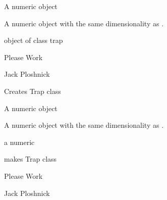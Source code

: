 \documentclass[a4paper]{book}
\begin{document}
%
\begin{Arguments}
\begin{ldescription}
\item[\code{x}] A numeric object

\item[\code{y}] A numeric object with the same dimensionality as .

\item[\code{StartToEnd}] 
\end{ldescription}
\end{Arguments}
%
\begin{Value}
object of class trap
\end{Value}
%
\begin{Note}\relax
Please Work
\end{Note}
%
\begin{Author}\relax
Jack Ploshnick
\end{Author}
%
\begin{SeeAlso}\relax
{}
\end{SeeAlso}
%
\begin{Description}\relax
Creates Trap class
\end{Description}
%
\begin{Arguments}
\begin{ldescription}
\item[\code{x}] A numeric object

\item[\code{y}] A numeric object with the same dimensionality as .

\item[\code{estimate}] a numeric
\end{ldescription}
\end{Arguments}
%
\begin{Value}
makes Trap class
\end{Value}
%
\begin{Note}\relax
Please Work
\end{Note}
%
\begin{Author}\relax
Jack Ploshnick
\end{Author}
%
\begin{SeeAlso}\relax
{}
\end{SeeAlso}
\printindex{}
\end{document}
